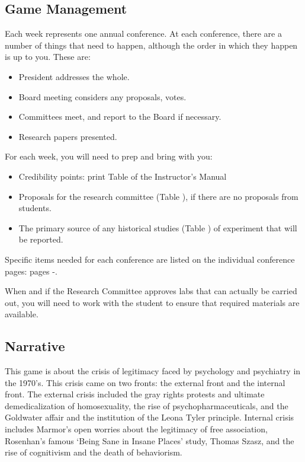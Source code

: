 \begin{refsection}
\chapter{Game Management}
\label{gamemanagement}

Each week represents one annual conference. At each conference, there are a number of things that need to happen, although the order in which they happen is up to you. These are:

\begin{itemize}
\item President addresses the whole.

\item Board meeting considers any proposals, votes.

\item Committees meet, and report to the Board if necessary.

\item Research papers presented.

\end{itemize}

For each week, you will need to prep and bring with you:

\begin{itemize}
\item Credibility points: print Table  of the Instructor's Manual

\item Proposals for the research committee (Table ), if there are no proposals from students.

\item The primary source of any historical studies (Table ) of experiment that will be reported.

\end{itemize}

Specific items needed for each conference are listed on the individual conference pages: pages \pageref{1971}-\pageref{1975}.

When and if the Research Committee approves labs that can actually be carried out, you will need to work with the student to ensure that required materials are available.

\section{Narrative}
\label{narrative}

This game is about the crisis of legitimacy faced by psychology and psychiatry in the 1970’s. This crisis came on two fronts: the external front and the internal front. The external crisis included the gray rights protests and ultimate demedicalization of homosexuality, the rise of psychopharmaceuticals, and the Goldwater affair and the institution of the Leona Tyler principle. Internal crisis includes Marmor’s open worries about the legitimacy of free association, Rosenhan’s famous ‘Being Sane in Insane Places’ study, Thomas Szasz, and the rise of cognitivism and the death of behaviorism.


\end{refsection}
